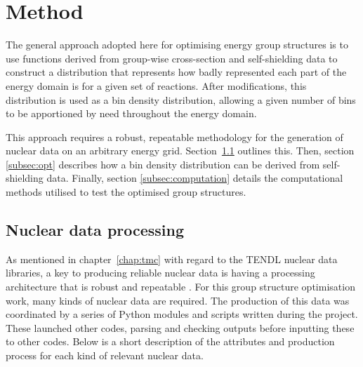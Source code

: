 


\section{Method}
\label{sec:method}
The general approach adopted here for optimising energy group structures is to use functions derived from group-wise cross-section and self-shielding data to construct a distribution that represents how badly represented each part of the energy domain is for a given set of reactions. After modifications, this distribution is used as a bin density distribution, allowing a given number of bins to be apportioned by need throughout the energy domain. 

This approach requires a robust, repeatable methodology for the generation of nuclear data on an arbitrary energy grid. Section~\ref{subsec:nd_processing} outlines this. Then, section \ref{subsec:opt} describes how a bin density distribution can be derived from self-shielding data. Finally, section \ref{subsec:computation} details the computational methods utilised to test the optimised group structures.

\subsection{Nuclear data processing}
\label{subsec:nd_processing}
As mentioned in chapter~\ref{chap:tmc} with regard to the TENDL nuclear data libraries, a key to producing reliable nuclear data is having a processing architecture that is robust and repeatable \cite{Koning2008}. For this group structure optimisation work, many kinds of nuclear data are required. The production of this data was coordinated by a series of Python modules and scripts written during the project. These launched other codes, parsing and checking outputs before inputting these to other codes. Below is a short description of the attributes and production process for each kind of relevant nuclear data.


